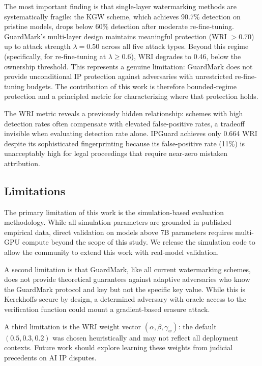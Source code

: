 \documentclass[journal,compsoc]{IEEEtran}
\begin{document}
The most important finding is that single-layer watermarking methods are
systematically fragile: the KGW scheme, which achieves 90.7\% detection on
pristine models, drops below 60\% detection after moderate re-fine-tuning.
GuardMark's multi-layer design maintains meaningful protection (WRI $> 0.70$)
up to attack strength $\lambda = 0.50$ across all five attack types.
Beyond this regime (specifically, for re-fine-tuning at $\lambda \geq 0.6$),
WRI degrades to 0.46, below the ownership threshold. This represents
a genuine limitation: GuardMark does not provide unconditional IP protection
against adversaries with unrestricted re-fine-tuning budgets.
The contribution of this work is therefore bounded-regime protection and
a principled metric for characterizing where that protection holds.

The WRI metric reveals a previously hidden relationship: schemes with high
detection rates often compensate with elevated false-positive rates, a tradeoff
invisible when evaluating detection rate alone. IPGuard achieves only 0.664
WRI despite its sophisticated fingerprinting because its false-positive rate
(11\%) is unacceptably high for legal proceedings that require near-zero
mistaken attribution.

\subsection{Limitations}

The primary limitation of this work is the simulation-based evaluation
methodology. While all simulation parameters are grounded in published
empirical data, direct validation on models above 7B parameters requires
multi-GPU compute beyond the scope of this study. We release the simulation
code to allow the community to extend this work with real-model validation.

A second limitation is that GuardMark, like all current watermarking schemes,
does not provide theoretical guarantees against adaptive adversaries who know
the GuardMark protocol and key but not the specific key value. While this is
Kerckhoffs-secure by design, a determined adversary with oracle access to the
verification function could mount a gradient-based erasure attack.

A third limitation is the WRI weight vector $(\alpha, \beta, \gamma_w)$: the
default $(0.5, 0.3, 0.2)$ was chosen heuristically and may not reflect all
deployment contexts. Future work should explore learning these weights from
judicial precedents on AI IP disputes.
\end{document}
